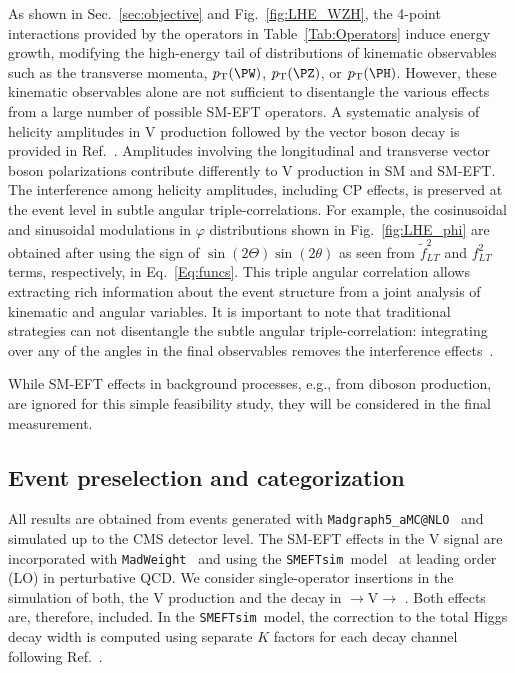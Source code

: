 \documentclass[a4paper,11pt]{article}
\newcommand{\Pb}{{{\Pqb}}\xspace}
\newcommand{\PAb}{{{{\Paqb}}}\xspace}
\renewcommand{\PV}{{{{V}}}\xspace}
\newcommand{\VH}{{{\PV}{\PH}}\xspace}
\newcommand{\pp}{{{\Pp}{\Pp}}\xspace}
\newcommand{\lplp}{{{\Pl}{\Pl}}\xspace}
\begin{document}
As shown in Sec.~\ref{sec:objective} and Fig.~\ref{fig:LHE_WZH}, the 4-point interactions provided by the operators in Table~\ref{Tab:Operators} induce energy growth, modifying the high-energy tail of distributions of kinematic observables such as the transverse momenta, $\pt(\PW)$, $\pt(\PZ)$, or $\pt(\PH)$. 
However, these kinematic observables alone are not sufficient to disentangle the various effects from a large number of possible SM-EFT operators. 
A systematic analysis of helicity amplitudes in \VH production followed by the vector boson decay is provided in Ref.~\cite{Banerjee:2019twi}. 
Amplitudes involving the longitudinal and transverse vector boson polarizations contribute differently to \VH production in SM and SM-EFT. 
The interference among helicity amplitudes, including CP effects, is preserved at the event level in subtle angular triple-correlations. 
For example, the cosinusoidal and sinusoidal modulations in $\varphi$ distributions shown in Fig.~\ref{fig:LHE_phi} are obtained after using the sign of $\sin\left(2\Theta\right)\sin\left(2\theta\right)$ as seen from $\tilde{f}^2_{LT}$ and $f^2_{LT}$ terms, respectively, in  Eq.~\ref{Eq:funcs}. 
This triple angular correlation allows extracting rich information about the event structure from a joint analysis of kinematic and angular variables. 
It is important to note that traditional strategies can not disentangle the subtle angular triple-correlation: integrating over any of the angles in the final observables removes the interference effects~\cite{Panico:2017frx}.

While SM-EFT effects in background processes, e.g., from diboson production, are ignored for this simple feasibility study, they will be considered in the final measurement.

\subsection{Event preselection and categorization}

All results are obtained from events generated with \texttt{Madgraph5\_aMC@NLO}~\cite{Alwall:2014hca} and simulated up to the CMS detector level. 
The SM-EFT effects in the \VH signal are incorporated with \texttt{MadWeight}~\cite{Artoisenet:2008zz} and using the \texttt{SMEFTsim}~model~\cite{Brivio:2017btx,Brivio:2020onw} at leading order (LO) in perturbative QCD. 
We consider single-operator insertions in the simulation of both, the \VH production and the decay in {\pp$\rightarrow$\VH$\rightarrow$ \lplp \Pb\PAb}. Both effects are, therefore, included. In the \texttt{SMEFTsim}~model, the correction to the total Higgs decay width is computed using separate $K$ factors for each decay channel following Ref.~\cite{Brivio:2019myy}.
\end{document}
